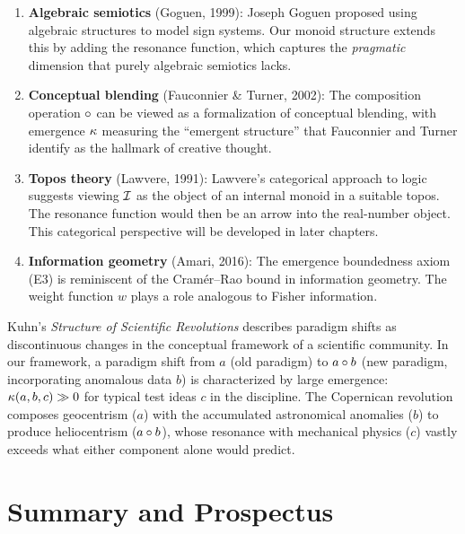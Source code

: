 \begin{enumerate}
    \item \textbf{Algebraic semiotics} (Goguen, 1999): Joseph Goguen proposed
    using algebraic structures to model sign systems. Our monoid structure
    extends this by adding the resonance function, which captures the
    \emph{pragmatic} dimension that purely algebraic semiotics lacks.

    \item \textbf{Conceptual blending} (Fauconnier \& Turner, 2002): The
    composition operation $\circ$ can be viewed as a formalization of
    conceptual blending, with emergence $\kappa$ measuring the ``emergent
    structure'' that Fauconnier and Turner identify as the hallmark of
    creative thought.

    \item \textbf{Topos theory} (Lawvere, 1991): Lawvere's categorical
    approach to logic suggests viewing $\mathcal{I}$ as the object of an internal
    monoid in a suitable topos. The resonance function would then be an
    arrow into the real-number object. This categorical perspective will be
    developed in later chapters.

    \item \textbf{Information geometry} (Amari, 2016): The emergence
    boundedness axiom (E3) is reminiscent of the Cram\'er--Rao bound in
    information geometry. The weight function $w$ plays a role analogous
    to Fisher information.
\end{enumerate}

\begin{example}
Kuhn's \emph{Structure of Scientific Revolutions} describes paradigm shifts
as discontinuous changes in the conceptual framework of a scientific
community. In our framework, a paradigm shift from $a$ (old paradigm) to
$a \circ b$ (new paradigm, incorporating anomalous data $b$) is
characterized by large emergence: $\kappa(a, b, c) \gg 0$ for typical
test ideas $c$ in the discipline. The Copernican revolution composes
geocentrism ($a$) with the accumulated astronomical anomalies ($b$) to
produce heliocentrism ($a \circ b$), whose resonance with mechanical
physics ($c$) vastly exceeds what either component alone would predict.
\end{example}

\section{Summary and Prospectus}


